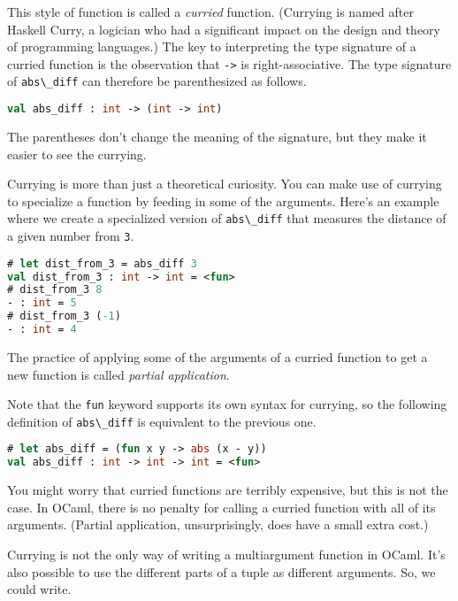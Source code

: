 This style of function is called a \emph{curried} function. (Currying is
named after Haskell Curry, a logician who had a significant impact on
the design and theory of programming languages.) The key to interpreting
the type signature of a curried function is the observation that
\passthrough{\lstinline!->!} is right-associative. The type signature of
\passthrough{\lstinline!abs\_diff!} can therefore be parenthesized as
follows. 

\begin{lstlisting}[language=Caml]
val abs_diff : int -> (int -> int)
\end{lstlisting}

The parentheses don't change the meaning of the signature, but they make
it easier to see the currying.

Currying is more than just a theoretical curiosity. You can make use of
currying to specialize a function by feeding in some of the arguments.
Here's an example where we create a specialized version of
\passthrough{\lstinline!abs\_diff!} that measures the distance of a
given number from \passthrough{\lstinline!3!}.

\begin{lstlisting}[language=Caml]
# let dist_from_3 = abs_diff 3
val dist_from_3 : int -> int = <fun>
# dist_from_3 8
- : int = 5
# dist_from_3 (-1)
- : int = 4
\end{lstlisting}

The practice of applying some of the arguments of a curried function to
get a new function is called \emph{partial
application}.

Note that the \passthrough{\lstinline!fun!} keyword supports its own
syntax for currying, so the following definition of
\passthrough{\lstinline!abs\_diff!} is equivalent to the previous
one.

\begin{lstlisting}[language=Caml]
# let abs_diff = (fun x y -> abs (x - y))
val abs_diff : int -> int -> int = <fun>
\end{lstlisting}

You might worry that curried functions are terribly expensive, but this
is not the case. In OCaml, there is no penalty for calling a curried
function with all of its arguments. (Partial application,
unsurprisingly, does have a small extra cost.)

Currying is not the only way of writing a multiargument function in
OCaml. It's also possible to use the different parts of a tuple as
different arguments. So, we could write.

